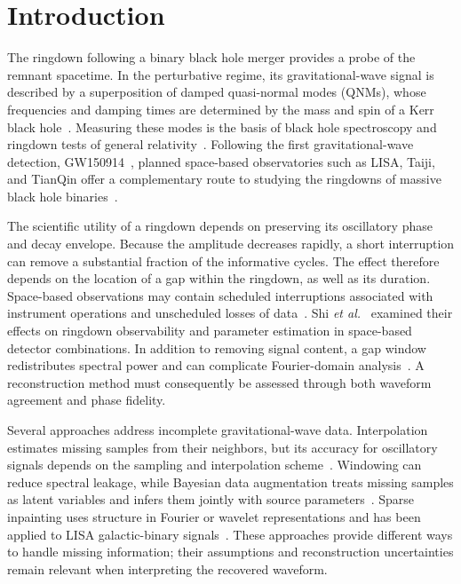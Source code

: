 \documentclass[10pt,prd,aps,a4paper,twocolumn,superscriptaddress,nofootinbib,floatfix]{revtex4-2}
\begin{document}
\section{Introduction}

The ringdown following a binary black hole merger provides a probe of the remnant spacetime. In the perturbative regime, its gravitational-wave signal is described by a superposition of damped quasi-normal modes (QNMs), whose frequencies and damping times are determined by the mass and spin of a Kerr black hole~\cite{berti2006gravitational,berti2009qnm}. Measuring these modes is the basis of black hole spectroscopy and ringdown tests of general relativity~\cite{Isi_2019}. Following the first gravitational-wave detection, GW150914~\cite{abbott2016observation,Abbott_2016}, planned space-based observatories such as LISA, Taiji, and TianQin offer a complementary route to studying the ringdowns of massive black hole binaries~\cite{amaroseoane2017laserinterferometerspaceantenna,robson2019construction,Ruan2020,Luo2016}.

The scientific utility of a ringdown depends on preserving its oscillatory phase and decay envelope. Because the amplitude decreases rapidly, a short interruption can remove a substantial fraction of the informative cycles. The effect therefore depends on the location of a gap within the ringdown, as well as its duration. Space-based observations may contain scheduled interruptions associated with instrument operations and unscheduled losses of data~\cite{Baghi2019,dey2021gaps}. Shi \textit{et al.}~\cite{shi2024effectsdatagapsringdown} examined their effects on ringdown observability and parameter estimation in space-based detector combinations. In addition to removing signal content, a gap window redistributes spectral power and can complicate Fourier-domain analysis~\cite{Harris1978}. A reconstruction method must consequently be assessed through both waveform agreement and phase fidelity.

Several approaches address incomplete gravitational-wave data. Interpolation estimates missing samples from their neighbors, but its accuracy for oscillatory signals depends on the sampling and interpolation scheme~\cite{Horowitz1974,Maeland1988,Unser1999}. Windowing can reduce spectral leakage, while Bayesian data augmentation treats missing samples as latent variables and infers them jointly with source parameters~\cite{Harris1978,Baghi2019}. Sparse inpainting uses structure in Fourier or wavelet representations and has been applied to LISA galactic-binary signals~\cite{Blelly2021,Starck2010}. These approaches provide different ways to handle missing information; their assumptions and reconstruction uncertainties remain relevant when interpreting the recovered waveform.
\end{document}
